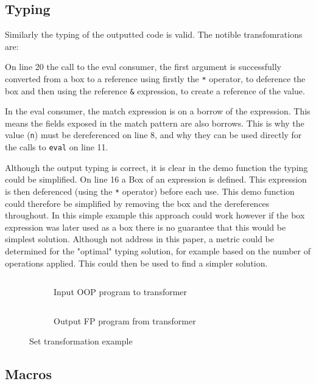 \documentclass[ oneside,%
                    author={James Elgar},
                    degree={MEng},
                     title={Bidirectional transformer between functional and \\ object-oriented programming in Rust},
                  subtitle={}]{dissertation}
\newcommand{\rust}[1]{\texttt{#1}}
\newcommand{\codefile}[2]{\inputminted[xleftmargin=20pt,linenos, breaklines]{#1}{#2}}
\newcommand{\rustfile}[1]{\codefile{rust}{../#1.rs}}
\newcommand{\rustexample}[1]{\rustfile{examples/src/#1}}
\newcommand{\rustoutput}[1]{\rustfile{outputs/src/#1}}
\begin{document}
\subsection{Typing}

Similarly the typing of the outputted code is valid. The notible transfomrations are:

On line 20 the call to the eval consumer, the first argument is successfully converted from a box to a reference using firstly the \rust{*} operator, to deference the box and then using the reference \rust{&} expression, to create a reference of the value.

In the eval consumer, the match expression is on a borrow of the expression. This means the fields exposed in the match pattern are also borrows. This is why the value (\rust{n}) must be dereferenced on line 8, and why they can be used directly for the calls to \rust{eval} on line 11.

Although the output typing is correct, it is clear in the demo function the typing could be simplified. On line 16 a Box of an expression is defined. This expression is then deferenced (using the \rust{*} operator) before each use. This demo function could therefore be simplified by removing the box and the dereferences throughout. In this simple example this approach could work however if the box expression was later used as a box there is no guarantee that this would be simplest solution. Although not address in this paper, a metric could be determined for the "optimal" typing solution, for example based on the number of operations applied. This could then be used to find a simpler solution.


\begin{figure}
\centering
\begin{subfigure}{.5\textwidth}
    \rustexample{exp/oop}
    \caption{Input OOP program to transformer}
    \label{fig:trans-set-ex-input}
\end{subfigure}%
\begin{subfigure}{.5\textwidth}
    \rustoutput{exp/oop}
    \caption{Output FP program from transformer}
    \label{fig:trans-set-ex-output}
\end{subfigure}
\caption{Set transformation example}
\label{fig:trans-set-ex}
\end{figure}

\subsection{Macros}
\end{document}
